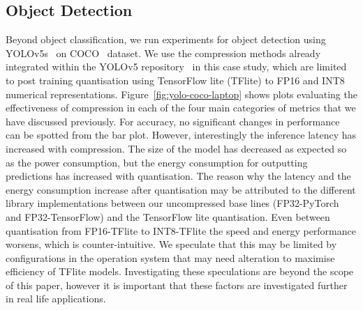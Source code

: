 \subsection{Object Detection}
Beyond object classification, we run experiments for object detection using YOLOv5s~\cite{Jocher_YOLOv5_by_Ultralytics_2020} on COCO~\cite{lin2015microsoft} dataset.
%
We use the compression methods already integrated within the YOLOv5 repository~\cite{Jocher_YOLOv5_by_Ultralytics_2020} in this case study, which are limited to post training quantisation using TensorFlow lite (TFlite) to FP16 and INT8 numerical representations.
%
Figure~\ref{fig:yolo-coco-laptop} shows plots evaluating the effectiveness of compression in each of the four main categories of metrics that we have discussed previously. 
%
For accuracy, no significant changes in performance can be spotted from the bar plot. 
%
However, interestingly the inference latency has increased with compression. 
%
The size of the model has decreased as expected so as the power consumption, but the energy consumption for outputting predictions has increased with quantisation.
%
The reason why the latency and the energy consumption increase after quantisation may be attributed to the different library implementations between our uncompressed base lines (FP32-PyTorch and FP32-TensorFlow) and the TensorFlow lite quantisation. 
%
Even between quantisation from FP16-TFlite to INT8-TFlite the speed and energy performance worsens, which is counter-intuitive. 
%
We speculate that this may be limited by configurations in the operation system that may need alteration to maximise efficiency of TFlite models. 
%
Investigating these speculations are beyond the scope of this paper, however it is important that these factors are investigated further in real life applications.

